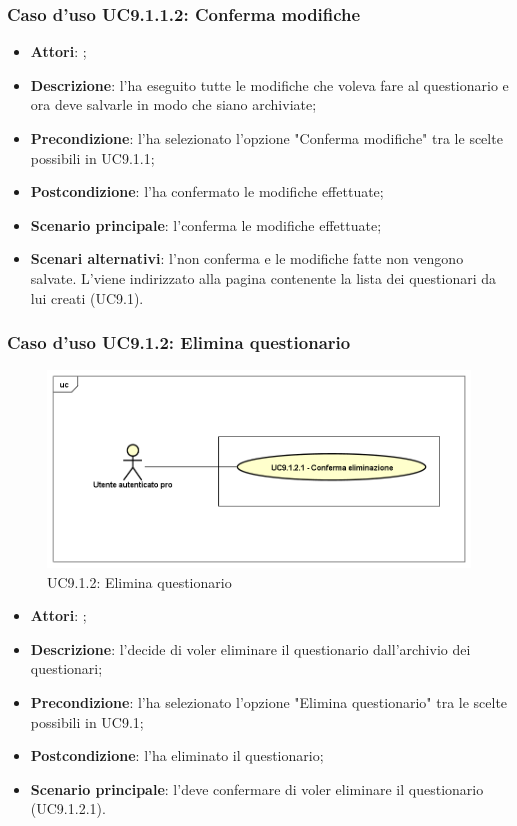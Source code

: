 					\subsubsection{Caso d'uso UC9.1.1.2: Conferma modifiche}
					\label{UC9.1.1.2}
					\begin{itemize}
						\item \textbf{Attori}: \uaupro;
						\item \textbf{Descrizione}: l'\uaupro ha eseguito tutte le modifiche che voleva fare al questionario e ora deve salvarle in modo che siano archiviate;
						\item \textbf{Precondizione}: l'\uaupro ha selezionato l'opzione "Conferma modifiche" tra le scelte possibili in UC9.1.1;
						\item \textbf{Postcondizione}: l'\uaupro ha confermato le modifiche effettuate;
						\item \textbf{Scenario principale}: l'\uaupro conferma le modifiche effettuate;
						\item \textbf{Scenari alternativi}: l'\uaupro non conferma e le modifiche fatte non vengono salvate. L'\uaupro viene indirizzato alla pagina contenente la lista dei questionari da lui creati (UC9.1).
					\end{itemize}
										
			\subsubsection{Caso d'uso UC9.1.2: Elimina questionario}
			\label{UC9.1.2}
			\begin{figure}[h]
				\centering
			\includegraphics[scale=0.5,keepaspectratio]{UML/UC9_1_2.png}
				\caption{UC9.1.2: Elimina questionario}
			\end{figure}
			\FloatBarrier
			\begin{itemize}
				\item \textbf{Attori}: \uaupro;
				\item \textbf{Descrizione}: l'\uaupro decide di voler eliminare il questionario dall'archivio dei questionari;
				\item \textbf{Precondizione}: l'\uaupro ha selezionato l'opzione "Elimina questionario" tra le scelte possibili in UC9.1;
				\item \textbf{Postcondizione}: l'\uaupro ha eliminato il questionario;
				\item \textbf{Scenario principale}: l'\uaupro deve confermare di voler eliminare il questionario (UC9.1.2.1).
			\end{itemize}
			
